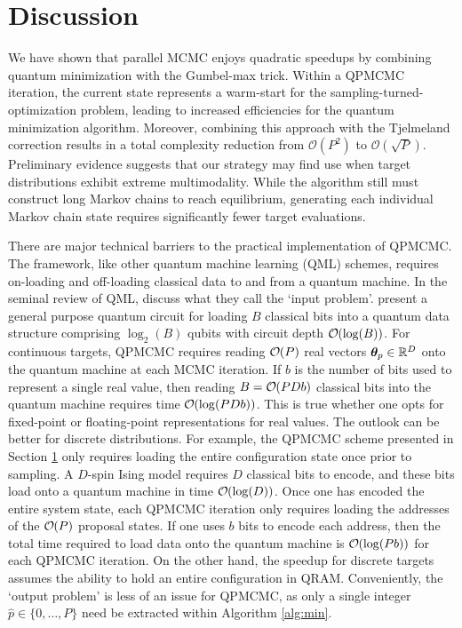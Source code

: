 \documentclass[12pt]{article} %
\newcommand{\order}[1]{{\cal O}\hspace{-0.2em}\left( #1 \right)}
\begin{document}
\section{Discussion}\label{sec:disc}

We have shown that parallel MCMC enjoys quadratic speedups by combining quantum minimization with the Gumbel-max trick.  Within a QPMCMC iteration, the current state represents a warm-start for the sampling-turned-optimization problem, leading to increased efficiencies for the quantum minimization algorithm.   Moreover, combining this approach with the Tjelmeland correction \citep{holbrook2021generating} results in a total complexity reduction from $\mathcal{O}(P^2)$ to $\mathcal{O}(\sqrt{P})$.  Preliminary evidence suggests that our strategy may find use when target distributions exhibit extreme multimodality.  While the algorithm still must construct long Markov chains to reach equilibrium, generating each individual Markov chain state requires significantly fewer target evaluations.

There are major technical barriers to the practical implementation of QPMCMC.  The framework, like other quantum machine learning (QML) schemes, requires on-loading and off-loading classical data to and from a quantum machine.  In the seminal review of QML, \citet{biamonte2017quantum} discuss what they call the `input problem'.  \citet{cortese2018loading} present a general purpose quantum circuit for loading $B$ classical bits into a quantum data structure comprising $\log_2 (B)$ qubits with circuit depth $\order{\log (B)}$.  For continuous targets, QPMCMC requires reading $\order{P}$ real vectors $\boldsymbol{\theta}_p\in \mathbb{R}^D$ onto the quantum machine at each MCMC iteration.  If $b$ is the number of bits used to represent a single real value, then reading $B=\order{PDb}$ classical bits into the quantum machine requires time $\order{\log (PDb)}$.  This is true whether one opts for fixed-point \citep{jordan2005fast} or floating-point \citep{haener2018quantum} representations for real values.  The outlook can be better for discrete distributions.  For example, the QPMCMC scheme presented in Section \ref{sec:disc} only requires loading the entire configuration state once prior to sampling.  A $D$-spin Ising model requires $D$ classical bits to encode, and these bits load onto a quantum machine in time $\order{\log(D)}$.  Once one has encoded the entire system state, each QPMCMC iteration only requires loading the addresses of the $\order{P}$ proposal states. If one uses $b$ bits to encode each address, then the total time required to load data onto the quantum machine is $\order{\log(Pb)}$ for each QPMCMC iteration.  On the other hand, the speedup for discrete targets assumes the ability to hold an entire configuration in QRAM.
Conveniently, the `output problem' is less of an issue for QPMCMC, as only a single integer $\hat{p} \in \{0,\dots,P\}$ need be extracted within Algorithm \ref{alg:min}.
\end{document}
